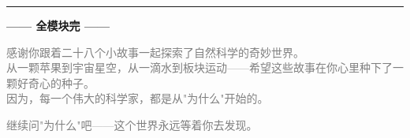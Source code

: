 \documentclass[a4paper,12pt]{ctexart}
\begin{document}
\vspace{0.5cm}

\begin{center}
\rule{0.7\textwidth}{1pt}

\vspace{0.4cm}
{\large\textcolor{blue!70!black}{\textbf{—— 全模块完 ——}}}

\vspace{0.3cm}
\textcolor{gray}{\small 感谢你跟着二十八个小故事一起探索了自然科学的奇妙世界。}\\
\textcolor{gray}{\small 从一颗苹果到宇宙星空，从一滴水到板块运动——希望这些故事在你心里种下了一颗好奇心的种子。}\\
\textcolor{gray}{\small 因为，每一个伟大的科学家，都是从"为什么"开始的。}

\vspace{0.3cm}
\textcolor{gray}{\small 继续问"为什么"吧——这个世界永远等着你去发现。}
\end{center}
\end{document}
